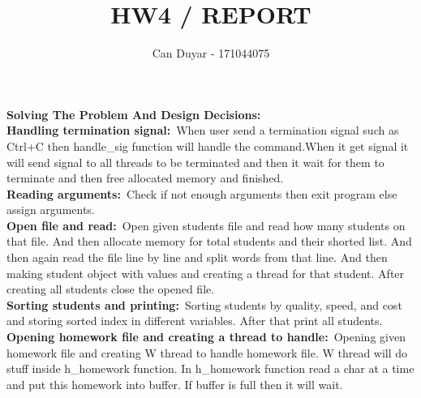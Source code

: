 \documentclass[a4 paper]{article}
\title{HW4 / REPORT}
\author{ Can Duyar - 171044075}
\begin{document}
\date{}
\maketitle

{\color{red}\large\textbf {Solving The Problem And Design Decisions:}}\newline\\

\textbf{Handling termination signal:}\newline\
\phantom{beta}When user send a termination signal such as Ctrl+C then handle\_sig function will handle the command.When it get signal it will send signal to all threads to be terminated and then it wait for them to terminate and then free allocated memory and finished.\newline\\

\textbf{Reading arguments:}\newline\
\phantom{beta}Check if not enough arguments then exit program else assign arguments. \newline\\

\textbf{Open file and read:}\newline\
\phantom{beta}Open given students file and read how many students on that file. And then allocate memory for total students and their shorted list. And then again read the file line by line and split words from that line. And then making student object with values and creating a thread for that student. After creating all students close the opened file.\newline\\


\textbf{Sorting students and printing:}\newline\
\phantom{beta}Sorting students by quality, speed, and cost and storing sorted index in different variables. After that print all students.\newline\\


\textbf{Opening homework file and creating a thread to handle:}\newline\
\phantom{beta}Opening given homework file and creating W thread to handle homework file. W thread will do stuff inside h\_homework function. In h\_homework function read a char at a time and put this homework into buffer. If buffer is full then it will wait. \newline\\
\end{document}
